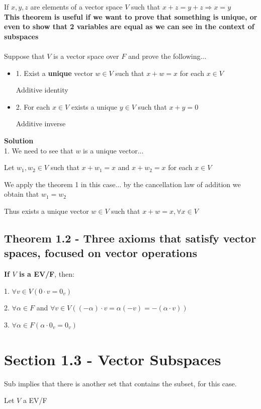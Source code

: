 \documentclass{article}
\begin{document}
If \(x, y, z\) are elements of a vector space \(V\) such that \(x+z=y+z \Rightarrow x= y\)
\\

\textbf{This theorem is useful if we want to prove that something is unique, or even to show that 2 variables are equal as we can see in the context of subspaces}
\\
\\
Suppose that \(V\) is a vector space over \(F\) and prove the following...
\begin{itemize}
    \item 1. Exist a \textbf{unique} vector \(w \in V\) such that \(x+w=x\) for each \(x \in V\)

    Additive identity
    \item 2. For each \(x \in V \) exists a unique \(y \in V\) such that \(x+y=0\)

    Additive inverse
\end{itemize}

\textbf{Solution}
\\
1. We need to see that \(w\) is a unique vector...

Let \(w_1, w_2 \in V\) such that \(x+w_1 = x\) and \(x+w_2=x\) for each \(x \in V\)

We apply the theorem 1 in this case... by the cancellation law of addition we obtain that \(w_1 = w_2\)

Thus exists a unique vector \(w \in V \) such that \(x+w=x, \forall x \in V\)

\subsection*{Theorem 1.2 - Three axioms that satisfy vector spaces, focused on vector operations}
\textbf{If \(V\) is a EV/F}, then:

1. \(\forall v \in V (0\cdot v = 0_v)\)

2. \(\forall \alpha \in F\) and \(\forall v \in V ((-\alpha)\cdot v = \alpha (-v) = -(\alpha \cdot v))\) 

3. \( \forall \alpha \in F (\alpha \cdot 0_v = 0_v)\)

\section*{Section 1.3 - Vector Subspaces}

Sub implies that there is another set that contains the subset, for this case.

Let \(V \) a EV/F
\end{document}
